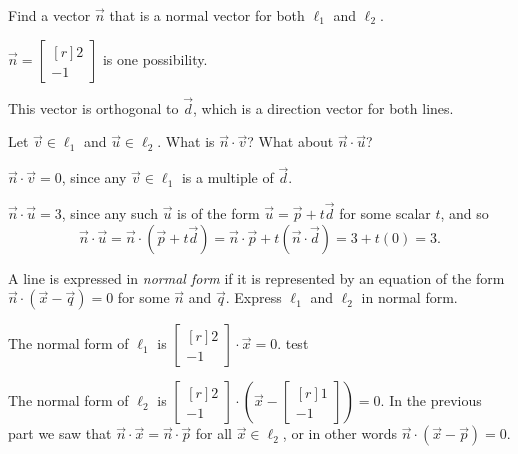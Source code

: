 \documentclass{problemset}
\newcommand{\mat}[1]{\begin{bmatrix*}[r]#1\end{bmatrix*}}
\begin{document}
	\begin{parts}
		\item Find a vector $\vec n$ that is a normal vector for both $\ell_1$
			and	$\ell_2$.
			\begin{solution}
				$\vec n=\mat{2\\-1}$ is one possibility.

				This vector is orthogonal to $\vec d$, which is a direction
				vector for both lines.
			\end{solution}
		\item Let $\vec v\in \ell_1$ and $\vec u\in \ell_2$.
			What is $\vec n\cdot \vec v$? What about $\vec n\cdot \vec u$?
			\begin{solution}
				$\vec n\cdot \vec v = 0$, since any $\vec v \in \ell_1$ is a multiple
				of $\vec d$.

				$\vec n\cdot \vec u=3$, since any such $\vec u$ is of the form
				$\vec u=\vec p+t\vec d$ for some scalar $t$, and so
				\[
					\vec n\cdot \vec u
					=\vec n\cdot (\vec p+t\vec d)
					=\vec n\cdot \vec p+t(\vec n\cdot \vec d)
					=3+t(0)
					=3.
				\]
			\end{solution}
		\item A line is expressed in \emph{normal form} if it is represented by
			an equation of the form $\vec n\cdot (\vec x-\vec q)=0$ for some
			$\vec n$ and $\vec q$. Express $\ell_1$ and $\ell_2$ in normal form.
			\begin{solution}
				The normal form of $\ell_1$ is $\mat{2\\-1}\cdot\vec x=0$. test

				The normal form of $\ell_2$ is $\mat{2\\-1}\cdot\left(\vec x-\mat{1\\-1}\right)=0$.
				In the previous part we saw that $\vec n\cdot \vec x=\vec n\cdot \vec p$
				for all $\vec x\in \ell_2$, or in other words $\vec n\cdot (\vec x-\vec p) = 0$.
			\end{solution}
	\end{parts}
\end{document}
